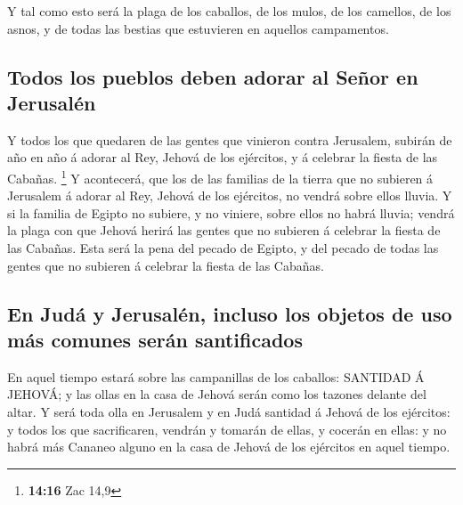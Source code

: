  Y tal como esto será la plaga de los caballos, de los
mulos, de los camellos, de los asnos, y de todas las bestias que
estuvieren en aquellos campamentos.

\hypertarget{todos-los-pueblos-deben-adorar-al-seuxf1or-en-jerusaluxe9n}{%
\subsection{Todos los pueblos deben adorar al Señor en
Jerusalén}\label{todos-los-pueblos-deben-adorar-al-seuxf1or-en-jerusaluxe9n}}

 Y todos los que quedaren de las gentes que vinieron contra
Jerusalem, subirán de año en año á adorar al Rey, Jehová de los
ejércitos, y á celebrar la fiesta de las Cabañas. \footnote{\textbf{14:16}
  Zac 14,9}  Y acontecerá, que los de las familias de la
tierra que no subieren á Jerusalem á adorar al Rey, Jehová de los
ejércitos, no vendrá sobre ellos lluvia.  Y si la familia
de Egipto no subiere, y no viniere, sobre ellos no habrá lluvia; vendrá
la plaga con que Jehová herirá las gentes que no subieren á celebrar la
fiesta de las Cabañas.  Esta será la pena del pecado de
Egipto, y del pecado de todas las gentes que no subieren á celebrar la
fiesta de las Cabañas.

\hypertarget{en-juduxe1-y-jerusaluxe9n-incluso-los-objetos-de-uso-muxe1s-comunes-seruxe1n-santificados}{%
\subsection{En Judá y Jerusalén, incluso los objetos de uso más comunes
serán
santificados}\label{en-juduxe1-y-jerusaluxe9n-incluso-los-objetos-de-uso-muxe1s-comunes-seruxe1n-santificados}}

 En aquel tiempo estará sobre las campanillas de los
caballos: SANTIDAD Á JEHOVÁ; y las ollas en la casa de Jehová serán como
los tazones delante del altar.  Y será toda olla en
Jerusalem y en Judá santidad á Jehová de los ejércitos: y todos los que
sacrificaren, vendrán y tomarán de ellas, y cocerán en ellas: y no habrá
más Cananeo alguno en la casa de Jehová de los ejércitos en aquel
tiempo.
